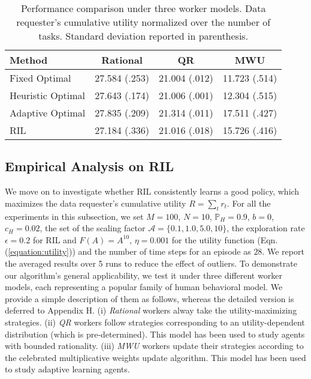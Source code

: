 \documentclass{article}
\newcommand{\ra}[1]{\renewcommand{\arraystretch}{#1}}
\begin{document}
      \begin{table}[t]
      \ra{1.05}
          \caption{Performance comparison under three worker models. Data requester's cumulative utility normalized over the number of tasks. Standard deviation reported in parenthesis.}
          \label{table:performance}
         	\vspace{3mm}
          \centering
          {\footnotesize
          \begin{sc}
          \begin{tabular}{ @{}l c c c@{} }
          \toprule
          Method & Rational & QR & MWU \\ \midrule
          Fixed Optimal & 27.584 (.253) & 21.004 (.012) & 11.723 (.514) \\
          Heuristic Optimal & 27.643 (.174) & 21.006 (.001) & 12.304 (.515)\\
          Adaptive Optimal & 27.835 (.209) & 21.314 (.011) & 17.511 (.427) \\
          \midrule
          RIL & 27.184 (.336) & 21.016 (.018) & 15.726 (.416)\\
		\bottomrule
		\end{tabular}
          \end{sc}
          }
          \vspace{-4mm}
   \end{table}
\endgroup

\subsection{Empirical Analysis on RIL}
We move on to investigate whether RIL consistently learns a good policy, which maximizes the data requester's cumulative utility $R=\sum_t r_t$.  For all the experiments in this subsection, we set $M=100$, $N=10$, $\mathbb{P}_H=0.9$, $b=0$, $c_H=0.02$, the %
set of the scaling factor $\mathcal{A}=\{0.1,1.0,5.0,10\}$, the exploration rate $\epsilon = 0.2 $ for RIL and  $F(A)=A^{10}$, $\eta=0.001$ for the utility function (Eqn. (\ref{equation:utility})) and the number of time steps for an episode as $28$. We report the averaged results over 5 runs to reduce the effect of outliers. To demonstrate our algorithm's general applicability, we test it under three different worker models, each representing a popular family of human behavioral model.
We provide a simple description of them as follows, whereas the detailed version is deferred to Appendix H. (i) \emph{Rational} workers alway take the utility-maximizing strategies. (ii) \emph{QR} workers \cite{mckelvey1995quantal} follow strategies corresponding to an utility-dependent distribution (which is pre-determined). This model has been used to study agents with bounded rationality. (iii) \emph{MWU} workers \cite{littlestone1994weighted} update their strategies according to the celebrated multiplicative weights update algorithm. This model has been used to study adaptive learning agents. 
\end{document}

